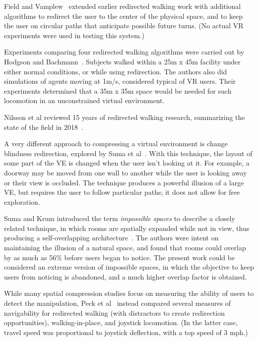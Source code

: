 \documentclass{sigchi}
\begin{document}
Field and Vamplew~\cite{field2004generalised} extended earlier redirected walking work with additional algorithms to redirect the user to the center of the physical space, and to keep the user on circular paths that anticipate possible future turns.  (No actual VR experiments were used in testing this system.)

Experiments comparing four redirected walking algorithms were carried out by Hodgson and Bachmann~\cite{hodgson2013comparing}.  Subjects walked within a 25m x 45m facility under either normal conditions, or while using redirection.  The authors also did simulations of agents moving at 1m/s, considered typical of VR users.  Their experiments determined that a 35m x 35m space would be needed for such locomotion in an unconstrained virtual environment.

Nilsson et al reviewed 15 years of redirected walking research, summarizing the state of the field in 2018~\cite{nilsson201815}.

A very different approach to compressing a virtual environment is change blindness redirection, explored by Suma et al~\cite{suma2011leveraging}.  With this technique, the layout of some part of the VE is changed when the user isn't looking at it.  For example, a doorway may be moved from one wall to another while the user is looking away or their view is occluded.  The technique produces a powerful illusion of a large VE, but requires the user to follow particular paths; it does not allow for free exploration.

Suma and Krum introduced the term \textit{impossible spaces} to describe a closely related technique, in which rooms are spatially expanded while not in view, thus producing a self-overlapping architecture~\cite{suma2012impossible}.  The authors were intent on maintaining the illusion of a natural space, and found that rooms could overlap by as much as 56\% before users began to notice.  The present work could be considered an extreme version of impossible spaces, in which the objective to keep users from noticing is abandoned, and a much higher overlap factor is obtained.

While many spatial compression studies focus on measuring the ability of users to detect the manipulation, Peck et al~\cite{peck2011evaluation} instead compared several measures of navigability for redirected walking (with distractors to create redirection opportunities), walking-in-place, and joystick locomotion.  (In the latter case, travel speed was proportional to joystick deflection, with a top speed of 3 mph.)
\end{document}
